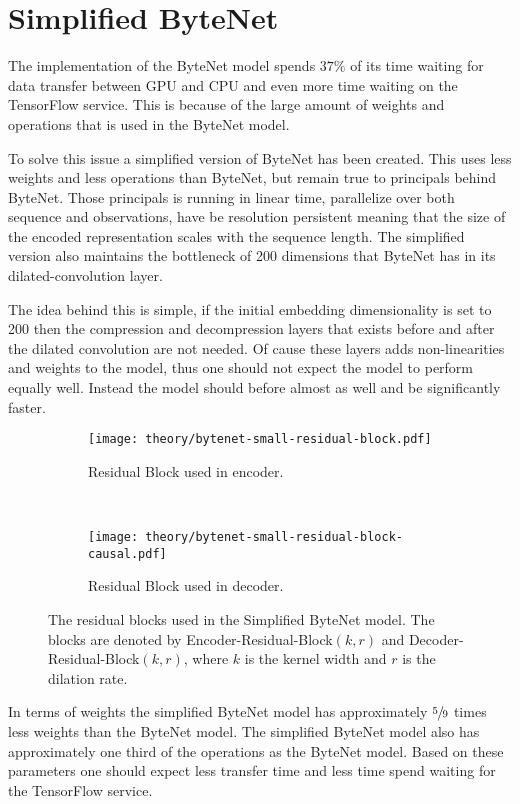 \section{Simplified ByteNet}

The implementation of the ByteNet model spends $37\%$ of its time waiting for data transfer between GPU and CPU and even more time waiting on the TensorFlow service. This is because of the large amount of weights and operations that is used in the ByteNet model.

To solve this issue a simplified version of ByteNet has been created. This uses less weights and less operations than ByteNet, but remain true to principals behind ByteNet. Those principals is running in linear time, parallelize over both sequence and observations, have be resolution persistent meaning that the size of the encoded representation scales with the sequence length. The simplified version also maintains the bottleneck of 200 dimensions that ByteNet has in its dilated-convolution layer.

The idea behind this is simple, if the initial embedding dimensionality is set to 200 then the compression and decompression layers that exists before and after the dilated convolution are not needed. Of cause these layers adds non-linearities and weights to the model, thus one should not expect the model to perform equally well. Instead the model should before almost as well and be significantly faster.

\begin{figure}[H]
    \centering
    \begin{subfigure}[b]{0.45\textwidth}
        \centering
        \texttt{[image: theory/bytenet-small-residual-block.pdf]}
        \caption{Residual Block used in encoder.}
    \end{subfigure}
    ~ %
    \begin{subfigure}[b]{0.45\textwidth}
        \centering
        \texttt{[image: theory/bytenet-small-residual-block-causal.pdf]}
        \caption{Residual Block used in decoder.}
    \end{subfigure}
    \caption{The residual blocks used in the Simplified ByteNet model. The blocks are denoted by Encoder-Residual-Block$(k,r)$ and Decoder-Residual-Block$(k,r)$, where $k$ is the kernel width and $r$ is the dilation rate.}
    \label{fig:result:simple-bytenet:residual-block}
\end{figure}

In terms of weights the simplified ByteNet model has approximately $\sfrac{5}{9}$ times less weights than the ByteNet model. The simplified ByteNet model also has approximately one third of the operations as the ByteNet model. Based on these parameters one should expect less transfer time and less time spend waiting for the TensorFlow service.

